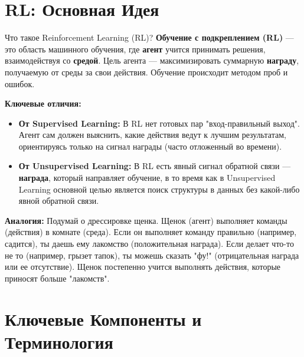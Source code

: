 
\section{RL: Основная Идея}

\begin{myblock}{Что такое Reinforcement Learning (RL)?}
    \textbf{Обучение с подкреплением (RL)} — это область машинного обучения, где \textbf{агент} учится принимать решения, взаимодействуя со \textbf{средой}. Цель агента — максимизировать суммарную \textbf{награду}, получаемую от среды за свои действия. Обучение происходит методом проб и ошибок.

    \textbf{Ключевые отличия:}
    \begin{itemize}
        \item \textbf{От Supervised Learning:} В RL нет готовых пар "вход-правильный выход". Агент сам должен выяснить, какие действия ведут к лучшим результатам, ориентируясь только на сигнал награды (часто отложенный во времени).
        \item \textbf{От Unsupervised Learning:} В RL есть явный сигнал обратной связи — \textbf{награда}, который направляет обучение, в то время как в Unsupervised Learning основной целью является поиск структуры в данных без какой-либо явной обратной связи.
    \end{itemize}
    \textbf{Аналогия:} Подумай о дрессировке щенка. Щенок (агент) выполняет команды (действия) в комнате (среда). Если он выполняет команду правильно (например, садится), ты даешь ему лакомство (положительная награда). Если делает что-то не то (например, грызет тапок), ты можешь сказать "фу!" (отрицательная награда или ее отсутствие). Щенок постепенно учится выполнять действия, которые приносят больше "лакомств".
\end{myblock}

\section{Ключевые Компоненты и Терминология}

